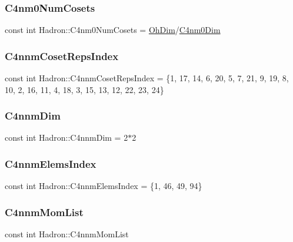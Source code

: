 \subsubsection{\texorpdfstring{C4nm0NumCosets}{C4nm0NumCosets}}
{\footnotesize\ttfamily const int Hadron\+::\+C4nm0\+Num\+Cosets = \mbox{\hyperlink{namespaceHadron_a2bea98b7ecd13619ef78b6d204d59707}{Oh\+Dim}}/\mbox{\hyperlink{namespaceHadron_afdf5d754d40795de402712dfe4fa0ab7}{C4nm0\+Dim}}}

\mbox{\label{namespaceHadron_a45efc71874946f8e0f89c14717a06a68}} 
\subsubsection{\texorpdfstring{C4nnmCosetRepsIndex}{C4nnmCosetRepsIndex}}
{\footnotesize\ttfamily const int Hadron\+::\+C4nnm\+Coset\+Reps\+Index = \{1, 17, 14, 6, 20, 5, 7, 21, 9, 19, 8, 10, 2, 16, 11, 4, 18, 3, 15, 13, 12, 22, 23, 24\}}

\mbox{\label{namespaceHadron_af60ad76cc44b9d853ae699af88a1a5cb}} 
\subsubsection{\texorpdfstring{C4nnmDim}{C4nnmDim}}
{\footnotesize\ttfamily const int Hadron\+::\+C4nnm\+Dim = 2$\ast$2}

\mbox{\label{namespaceHadron_a6352bd80b67b77534019070d2e8ada82}} 
\subsubsection{\texorpdfstring{C4nnmElemsIndex}{C4nnmElemsIndex}}
{\footnotesize\ttfamily const int Hadron\+::\+C4nnm\+Elems\+Index = \{1, 46, 49, 94\}}

\mbox{\label{namespaceHadron_a2ec1cded04eb336aa68867febe1878cb}} 
\subsubsection{\texorpdfstring{C4nnmMomList}{C4nnmMomList}}
{\footnotesize\ttfamily const int Hadron\+::\+C4nnm\+Mom\+List}

